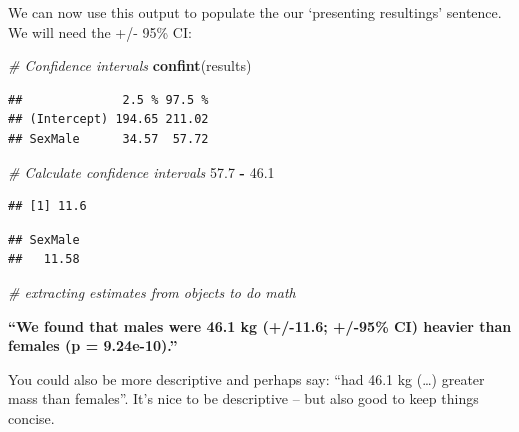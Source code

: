 \documentclass[
]{article}
\newenvironment{Shaded}{\begin{snugshade}}{\end{snugshade}}
\newcommand{\CommentTok}[1]{\textcolor[rgb]{0.56,0.35,0.01}{\textit{#1}}}
\newcommand{\DecValTok}[1]{\textcolor[rgb]{0.00,0.00,0.81}{#1}}
\newcommand{\FloatTok}[1]{\textcolor[rgb]{0.00,0.00,0.81}{#1}}
\newcommand{\FunctionTok}[1]{\textcolor[rgb]{0.13,0.29,0.53}{\textbf{#1}}}
\newcommand{\NormalTok}[1]{#1}
\newcommand{\SpecialCharTok}[1]{\textcolor[rgb]{0.81,0.36,0.00}{\textbf{#1}}}
\newcommand{\StringTok}[1]{\textcolor[rgb]{0.31,0.60,0.02}{#1}}
\begin{document}
We can now use this output to populate the our `presenting resultings'
sentence. We will need the +/- 95\% CI:

\begin{Shaded}
\begin{Highlighting}[]
\CommentTok{\# Confidence intervals}
\FunctionTok{confint}\NormalTok{(results)}
\end{Highlighting}
\end{Shaded}

\begin{verbatim}
##              2.5 % 97.5 %
## (Intercept) 194.65 211.02
## SexMale      34.57  57.72
\end{verbatim}

\begin{Shaded}
\begin{Highlighting}[]
\CommentTok{\# Calculate confidence intervals}
\FloatTok{57.7} \SpecialCharTok{{-}} \FloatTok{46.1}
\end{Highlighting}
\end{Shaded}

\begin{verbatim}
## [1] 11.6
\end{verbatim}

\begin{Shaded}
\end{Shaded}

\begin{verbatim}
## SexMale 
##   11.58
\end{verbatim}

\begin{Shaded}
\begin{Highlighting}[]
\CommentTok{\# extracting estimates from objects to do math}
\end{Highlighting}
\end{Shaded}

\textbf{``We found that males were 46.1 kg (+/-11.6; +/-95\% CI) heavier
than females (p = 9.24e-10).''}

You could also be more descriptive and perhaps say: ``had 46.1 kg
(\ldots) greater mass than females''. It's nice to be descriptive -- but
also good to keep things concise.
\end{document}
